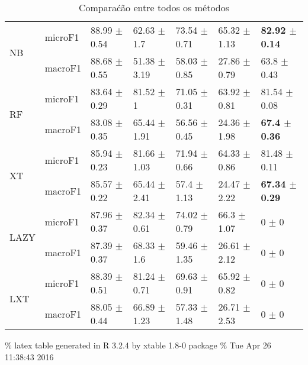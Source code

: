 \documentclass[]{article}
\begin{document}
\begin{table}[ht]
\begin{tabular}{lllllll}
   \cline{3-7}\multirow{2}{*}{NB} & microF1 & 88.99 $\pm$  0.54 & 62.63 $\pm$  1.7 & 73.54 $\pm$  0.71 & 65.32 $\pm$  1.13 & \bf{82.92 $\pm$  0.14} \\ 
   & macroF1 & 88.68 $\pm$  0.55 & 51.38 $\pm$  3.19 & 58.03 $\pm$  0.85 & 27.86 $\pm$  0.79 & 63.8 $\pm$  0.43 \\ 
   \cline{3-7}\multirow{2}{*}{RF} & microF1 & 83.64 $\pm$  0.29 & 81.52 $\pm$  1 & 71.05 $\pm$  0.31 & 63.92 $\pm$  0.81 & 81.54 $\pm$  0.08 \\ 
   & macroF1 & 83.08 $\pm$  0.35 & 65.44 $\pm$  1.91 & 56.56 $\pm$  0.45 & 24.36 $\pm$  1.98 & \bf{67.4 $\pm$  0.36} \\ 
   \cline{3-7}\multirow{2}{*}{XT} & microF1 & 85.94 $\pm$  0.23 & 81.66 $\pm$  1.03 & 71.94 $\pm$  0.66 & 64.33 $\pm$  0.86 & 81.48 $\pm$  0.11 \\ 
   & macroF1 & 85.57 $\pm$  0.22 & 65.44 $\pm$  2.41 & 57.4 $\pm$  1.13 & 24.47 $\pm$  2.22 & \bf{67.34 $\pm$  0.29} \\ 
   \cline{3-7}\multirow{2}{*}{LAZY} & microF1 & 87.96 $\pm$  0.37 & 82.34 $\pm$  0.61 & 74.02 $\pm$  0.79 & 66.3 $\pm$  1.07 & 0 $\pm$  0 \\ 
   & macroF1 & 87.39 $\pm$  0.37 & 68.33 $\pm$  1.6 & 59.46 $\pm$  1.35 & 26.61 $\pm$  2.12 & 0 $\pm$  0 \\ 
   \cline{3-7}\multirow{2}{*}{LXT} & microF1 & 88.39 $\pm$  0.51 & 81.24 $\pm$  0.71 & 69.63 $\pm$  0.91 & 65.92 $\pm$  0.82 & 0 $\pm$  0 \\ 
   & macroF1 & 88.05 $\pm$  0.44 & 66.89 $\pm$  1.23 & 57.33 $\pm$  1.48 & 26.71 $\pm$  2.53 & 0 $\pm$  0 \\ 
   \cline{3-7}\end{tabular}
\caption{Comparaćão entre todos os métodos} 
\end{table}

\% latex table generated in R 3.2.4 by xtable 1.8-0 package \% Tue Apr
26 11:38:43 2016
\end{document}
